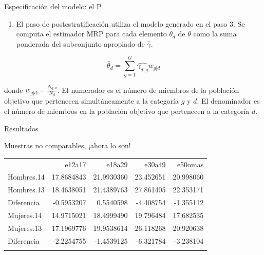 \documentclass[ignorenonframetext,]{beamer}
\begin{document}
\begin{frame}{Especificación del modelo: el P}

\begin{enumerate}
\def\labelenumi{\arabic{enumi}.}
\setcounter{enumi}{3}
\itemsep1pt\parskip0pt
\item
  El paso de postestratificación utiliza el modelo generado en el paso
  3. Se computa el estimador MRP para cada elemento $\theta_d$ de
  $\theta$ como la suma ponderada del subconjunto apropiado de
  $\hat{\gamma}$.
\end{enumerate}

\[
\tilde{\theta_d} = \sum_{g=1}^{G} \hat{\gamma_{d,g}} w_{g|d}
\]

donde $w_{g|d}=\frac{N_{g,d}}{N_d}$. El numerador es el número de
miembros de la población objetivo que pertenecen simultáneamente a la
categoría $g$ y $d$. El denominador es el número de miembros en la
población objetivo que pertenecen a la categoría $d$.

\end{frame}

\begin{frame}{Resultados}

Muestras no comparables, ¡ahora lo son!

\begin{longtable}[c]{@{}lrrrr@{}}
\toprule\addlinespace
& e12a17 & e18a29 & e30a49 & e50omas
\\\addlinespace
\midrule\endhead
Hombres.14 & 17.8684843 & 21.9930360 & 23.452651 & 20.998060
\\\addlinespace
Hombres.13 & 18.4638051 & 21.4389763 & 27.861405 & 22.353171
\\\addlinespace
Diferencia & -0.5953207 & 0.5540598 & -4.408754 & -1.355112
\\\addlinespace
Mujeres.14 & 14.9715021 & 18.4999490 & 19.796484 & 17.682535
\\\addlinespace
Mujeres.13 & 17.1969776 & 19.9538614 & 26.118268 & 20.920638
\\\addlinespace
Diferencia & -2.2254755 & -1.4539125 & -6.321784 & -3.238104
\\\addlinespace
\bottomrule
\end{longtable}

\end{frame}
\end{document}
